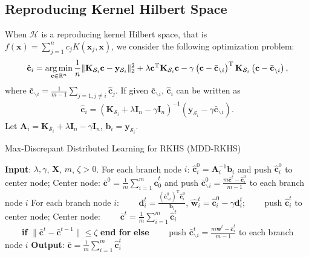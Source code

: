 \documentclass{article}
\newcommand{\argmin}{\operatornamewithlimits{arg\,min}}
\begin{document}
\subsection{Reproducing Kernel Hilbert Space}
When $\mathcal{H}$ is a reproducing kernel Hilbert space, that is $f(\mathbf x)=\sum_{j=1}^n c_j K(\mathbf x_j,\mathbf x)$,
we consider the following optimization problem:
\begin{align}
\label{opti-RKHS}
  \hat{\mathbf c}_i=\argmin_{\mathbf c\in\mathbb{R}^n}
  \frac{1}{n}\|\mathbf K_{\mathcal{S}_i}\mathbf c-\mathbf y_{\mathcal{S}_i}\|_2^2+\lambda \mathbf c^\mathrm{T}\mathbf K_{\mathcal{S}_i}\mathbf c
  -\gamma \left(\mathbf c- \bar{\mathbf c}_{\backslash i}\right)^\mathrm{T}
  \mathbf K_{\mathcal{S}_i}\left(\mathbf c- \bar{\mathbf c}_{\backslash i}\right),
\end{align}
where $\bar{\mathbf c}_{\backslash i}=\frac{1}{m-1}\sum_{j=1,j\not =i}\hat{\mathbf c}_j$.
If given $\bar{\mathbf c}_{\backslash i}$, $\hat{\mathbf c}_i$ can be written as
\begin{align*}
  \hat{\mathbf c}_i=\left(\mathbf K_{\mathcal{S}_i}+\lambda \mathbf I_n-\gamma\mathbf I_n\right)^{-1}
  \left(\mathbf y_{\mathcal{S}_i}-\gamma \bar{\mathbf c}_{\backslash i}\right).
\end{align*}
Let $\mathbf A_i=\mathbf K_{\mathcal{S}_i}+\lambda \mathbf I_n-\gamma\mathbf I_n$, $\mathbf b_i=\mathbf y_{\mathcal{S}_i}$.
\begin{algorithm}[t]
    \caption{Max-Discrepant Distributed Learning for RKHS (MDD-RKHS)}
    \label{alg:RMMKL}
    \begin{algorithmic}[1]
    \STATE \textbf{Input}: $\lambda,\gamma$, $\mathbf X$, $m$, $\zeta>0$.
    \STATE For each branch node $i$:  $\hat{\mathbf c}_i^0=\mathbf A_i^{-1} \mathbf b_i$ and push $\hat{\mathbf c}_i^0$ to center node;
    \STATE Center node: $\bar{\mathbf c}^0=\frac{1}{m}\sum_{i=1}^m\hat{\mathbf c}_0^t$ and
    push $\bar{\mathbf c}^{0}_{\backslash i}=\frac{m\bar{\mathbf c}^{t}-\hat{\mathbf c}_i^0}{m-1}$ to each branch node $i$
    \STATE  For each branch node $i$:
    \STATE ~~~~$\mathbf d_i^t=\frac{\left(\bar{\mathbf c}^0_{\backslash i}\right)^\mathrm{T}\hat{\mathbf c}_i^0}{\mathbf b_i}$,
     $\hat{\mathbf w}_i^t=\hat{\mathbf c}_i^0-\gamma\mathbf d_i^t$;
    \STATE ~~~~push $\hat{\mathbf c}_i^t$ to center node;
     \STATE Center node:
     \STATE ~~~~$\bar{\mathbf c}^t=\frac{1}{m}\sum_{i=1}^m\hat{\mathbf c}_i^t$\\
      ~~~~\textbf{if} {$\|\bar{\mathbf c}^{t}-\bar{\mathbf c}^{t-1}\|\leq \zeta$} \textbf{end for}
      \STATE \textbf{else}
      \STATE ~~~~push $\bar{\mathbf c}^{t}_{\backslash i}=\frac{m\bar{\mathbf w}^{t}-\hat{\mathbf c}_i^t}{m-1}$ to each branch node $i$
    \ENDFOR
    \STATE \textbf{Output}: $\bar{\mathbf c}=\frac{1}{m}\sum_{i=1}^m\hat{\mathbf c}_i^t$
    \end{algorithmic}
\end{algorithm}
\end{document}
